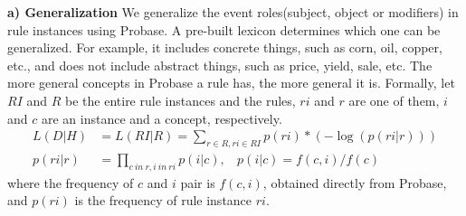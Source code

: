 \textbf{a) Generalization}
We generalize the event roles(subject, object or modifiers) in rule instances using Probase. A pre-built lexicon determines which one can be generalized. For example, it includes concrete things, such as corn, oil, copper, etc., and does not include abstract things, such as price, yield, sale, etc.
The more general concepts in Probase a rule has, the more general it is. Formally, let $RI$ and $R$ be the entire rule instances and the rules, $ri$ and $r$ are one of them, $i$ and $c$ are an instance and a concept, respectively.
\begin{equation*}
\begin{split}
L(D|H)&=L(RI|R)=\sum_{r \in R, ri \in RI}{p(ri)*(-\log(p(ri|r)))} \\
p(ri|r)&=\prod_{c\ in\ r,i\ in\ ri}{p(i|c)}, \ \ \ \  p(i|c)=f(c,i)/f(c)
\end{split}
\label{equ:mdl_1}
\end{equation*}
where the frequency of $c$ and $i$ pair is $f(c,i)$, obtained directly from Probase, and $p(ri)$ is the frequency of rule instance $ri$.

